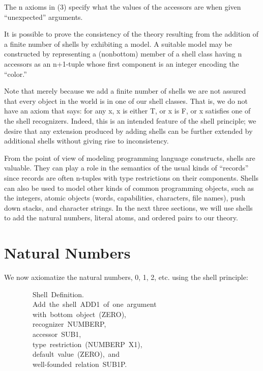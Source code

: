 \documentclass[10pt]{book}
\newenvironment{pubasis}{\begin{flushleft}}{\end{flushleft}}
\begin{document}
\hrulefill 

The n axioms in (3) specify what the values of the accessors
are when given ``unexpected'' arguments.

It is possible to prove the consistency of the theory resulting from
the addition of a finite number of shells by exhibiting a model.
A suitable model may be constructed by representing a (nonbottom)
member of a shell class having n accessors as an n+1-tuple
whose first component is an integer encoding the ``color.''

Note  that merely because we
add a finite number of shells we are not assured that every object
in the world is in one of our shell classes.  That is, we do not have
an axiom that says: for any x, x is either T, or x is F, or x satisfies one
of the shell recognizers.  Indeed, this is an intended feature of the
shell principle; we desire that any extension produced by
adding shells can be further extended by additional shells without
giving rise to inconsistency.

From the point of view of modeling programming language constructs,
shells are  valuable.  They can play a role in
the semantics of the usual kinds of ``records''
since records are often n-tuples with type restrictions on their
components.  Shells can also be used to model
other kinds of common programming objects, such as the integers,
atomic objects (words, capabilities, characters, file names),
push down stacks,  and character strings.  In the next three
sections, we will use shells to add the natural numbers,
literal atoms, and  ordered pairs to our theory.

\section{Natural Numbers}
We now axiomatize the natural numbers, 0, 1, 2, etc.  using
the shell principle:

\hrulefill 

\begin{pubasis}
~~~~~~~~Shell~Definition.\\
~~~~~~~~Add~the~shell~ADD1~of~one~argument~\\
~~~~~~~~with~bottom~object~(ZERO),\\
~~~~~~~~recognizer~NUMBERP,\\
~~~~~~~~accessor~SUB1,\\
~~~~~~~~type~restriction~(NUMBERP~X1),\\
~~~~~~~~default~value~(ZERO),~and\\
~~~~~~~~well-founded~relation~SUB1P.\\
\end{pubasis}
\end{document}
